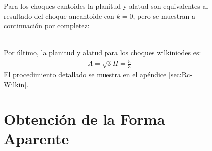 \begin{figure}
Para los choques cantoides la planitud y alatud son equivalentes al resultado del choque ancantoide con $k=0$, pero se muestran a continuación por completez:

\begin{align}
\end{align}

Por último, la planitud y alatud para los choques wilkiniodes es:
\begin{align}
  \Lambda = \sqrt{3} \label{eq:R90-Wilkin}
  \Pi = \frac{5}{3} \label{eq:Rc-Wilkin}
\end{align}
El procedimiento detallado se muestra en el apéndice \ref{sec:Rc-Wilkin}.

\section{Obtención de la Forma Aparente}


  


\end{figure}
